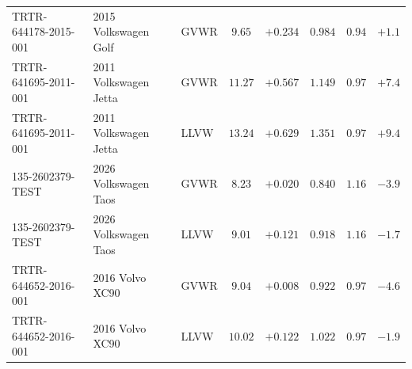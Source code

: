 {\begin{longtable}{lp{2.9cm}lccccc}
TRTR-644178-2015-001 & 2015 Volkswagen Golf & GVWR & $9.65$ & $+0.234$ & $0.984$ & $0.94$ & $+1.1$\\
TRTR-641695-2011-001 & 2011 Volkswagen Jetta & GVWR & $11.27$ & $+0.567$ & $1.149$ & $0.97$ & $+7.4$\\
TRTR-641695-2011-001 & 2011 Volkswagen Jetta & LLVW & $13.24$ & $+0.629$ & $1.351$ & $0.97$ & $+9.4$\\
135-2602379-TEST & 2026 Volkswagen Taos & GVWR & $8.23$ & $+0.020$ & $0.840$ & $1.16$ & $-3.9$\\
135-2602379-TEST & 2026 Volkswagen Taos & LLVW & $9.01$ & $+0.121$ & $0.918$ & $1.16$ & $-1.7$\\
TRTR-644652-2016-001 & 2016 Volvo XC90 & GVWR & $9.04$ & $+0.008$ & $0.922$ & $0.97$ & $-4.6$\\
TRTR-644652-2016-001 & 2016 Volvo XC90 & LLVW & $10.02$ & $+0.122$ & $1.022$ & $0.97$ & $-1.9$\\
\end{longtable}}
